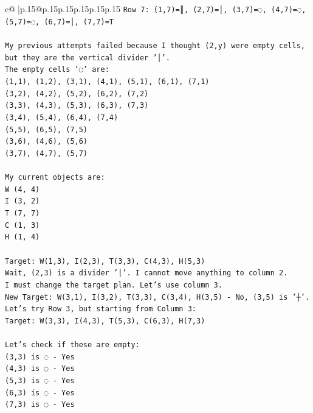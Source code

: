 \documentclass{article}
\begin{document}
{\begin{supertabular}{c@{$\;$}|p{.15\linewidth}@{}p{.15\linewidth}p{.15\linewidth}p{.15\linewidth}p{.15\linewidth}p{.15\linewidth}}
{{{\texttt{Row 7: (1,7)=║, (2,7)=│, (3,7)=◌, (4,7)=◌, (5,7)=◌, (6,7)=│, (7,7)=T} \\
\\ 
\texttt{My previous attempts failed because I thought (2,y) were empty cells, but they are the vertical divider '│'.} \\
\texttt{The empty cells '◌' are:} \\
\texttt{(1,1), (1,2), (3,1), (4,1), (5,1), (6,1), (7,1)} \\
\texttt{(3,2), (4,2), (5,2), (6,2), (7,2)} \\
\texttt{(3,3), (4,3), (5,3), (6,3), (7,3)} \\
\texttt{(3,4), (5,4), (6,4), (7,4)} \\
\texttt{(5,5), (6,5), (7,5)} \\
\texttt{(3,6), (4,6), (5,6)} \\
\texttt{(3,7), (4,7), (5,7)} \\
\\ 
\texttt{My current objects are:} \\
\texttt{W (4, 4)} \\
\texttt{I (3, 2)} \\
\texttt{T (7, 7)} \\
\texttt{C (1, 3)} \\
\texttt{H (1, 4)} \\
\\ 
\texttt{Target: W(1,3), I(2,3), T(3,3), C(4,3), H(5,3)} \\
\texttt{Wait, (2,3) is a divider '│'. I cannot move anything to column 2.} \\
\texttt{I must change the target plan. Let's use column 3.} \\
\texttt{New Target: W(3,1), I(3,2), T(3,3), C(3,4), H(3,5) {-} No, (3,5) is '┼'.} \\
\texttt{Let's try Row 3, but starting from Column 3:} \\
\texttt{Target: W(3,3), I(4,3), T(5,3), C(6,3), H(7,3)} \\
\\ 
\texttt{Let's check if these are empty:} \\
\texttt{(3,3) is ◌ {-} Yes} \\
\texttt{(4,3) is ◌ {-} Yes} \\
\texttt{(5,3) is ◌ {-} Yes} \\
\texttt{(6,3) is ◌ {-} Yes} \\
\texttt{(7,3) is ◌ {-} Yes} \\
\\ 
}}}
\end{supertabular}}
\end{document}
